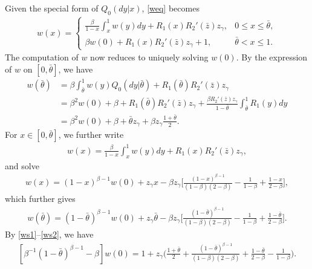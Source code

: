 \documentclass[graybox]{svmult}
\begin{document}
Given the special form of $Q_0(dy|x)$, \eqref{weq} becomes
\begin{align} \label{wequni}
w(x)=
\begin{cases}
  \displaystyle
\frac{\beta}{ 1-x} \int_x^1 w(y)dy+R_1(x)R_2'(\bar z) z_\gamma,& 0\le x\le \bar \theta, \\
 \displaystyle
\beta w(0)+R_1(x)R_2'(\bar z)z_\gamma+1, &  \bar \theta<x\le 1.
\end{cases}
\end{align}
 The computation of $w$ now reduces to uniquely solving $w(0)$.
By the expression of $w$ on $[0, \bar\theta]$,  we have
\begin{align}
w(\bar\theta)&= \beta \int_{\bar\theta}^1 w(y)Q_0(dy|\bar \theta) +
R_1(\bar\theta)R_2'(\bar z) z_\gamma\nonumber\\
&=\beta^2 w(0)+\beta+R_1(\bar \theta)R_2'(\bar z) z_\gamma   + \frac{\beta R_2' (\bar z)z_\gamma}{1-\bar\theta}\int_{\bar \theta}^1 R_1(y)dy\nonumber \\
&= \beta^2 w(0)+\beta+\bar\theta z_\gamma + \beta z_\gamma \frac{1+\bar\theta}{2}. \label{ws1}
\end{align}
For $x\in [0, \bar\theta]$,
we further write
\begin{align}
w(x)=\frac{\beta}{1-x} \int_x^1 w(y)dy+R_1(x)R_2'(\bar z) z_\gamma,\nonumber
\end{align}
and solve
\begin{align}
w(x)= (1-x)^{\beta-1} w(0)+z_\gamma x-\beta z_\gamma
\Big[\frac{(1-x)^{\beta-1}}{(1-\beta)(2-\beta)} -\frac{1}{1-\beta} +\frac{1-x}{2-\beta}\Big],
\nonumber
\end{align}
which further gives
\begin{align}\label{ws2}
w(\bar  \theta)=  (1-\bar \theta)^{\beta-1} w(0)+ z_\gamma\bar \theta -\beta z_\gamma
\Big[\frac{(1-\bar\theta)^{\beta-1}}{(1-\beta)(2- \beta)} -\frac{1}{1-\beta} +\frac{1-\bar\theta}{2-\beta}\Big].
\end{align}
 By \eqref{ws1}--\eqref{ws2},  we have
\begin{align}\label{csew0}
[\beta^{-1}(1-\bar \theta)^{\beta-1}-\beta]w(0)= 1+z_\gamma \Big(\frac{1+\bar\theta}{2} +\frac{(1-\bar\theta)^{\beta-1}}{ (1-\beta)(2-\beta)} +\frac{1-\bar\theta}{2-\beta} - \frac{1}{1-\beta}  \Big).
\end{align}
\end{document}
